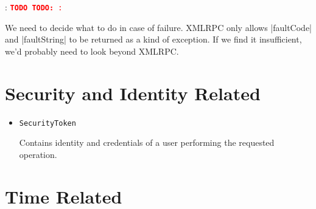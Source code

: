 \documentclass[a4paper]{report}
\newcommand{\APIcode}[1]{\lstinline[style=myinline]!#1!}
\newcommand{\APIcmd}[1]{%
\item \APIcode{#1}%

}
\newenvironment{APIdef}{\begin{itemize}}{\end{itemize}}
\newcommand{\TODO}[1]{%
\def\empty{}%
\def\prvniparametr{#1}%
\ifx\prvniparametr\empty%
\begingroup\tt\textcolor{red}{\noindent\textbf{TODO}}\endgroup
\else%
\begingroup\tt\textcolor{red}{\noindent\textbf{TODO:}\ #1}\endgroup
\fi%
}
\begin{document}
\TODO{:}
We need to decide what to do in case of failure. XMLRPC only allows |faultCode| and |faultString| to be returned as a kind of exception. If we find it insufficient, we'd probably need to look beyond XMLRPC.


\section{Security and Identity Related}

\begin{APIdef}

\APIcmd{SecurityToken}
Contains identity and credentials of a user performing the requested operation.

\end{APIdef}


\section{Time Related}
\end{document}
